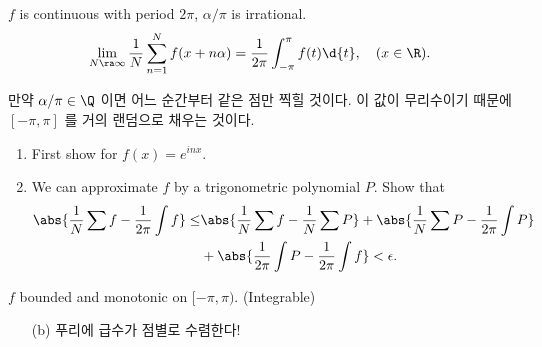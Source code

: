  \(f\) is continuous with period \(2\pi\), \(\alpha/\pi\) is irrational.
\[
    \lim_{N\ra\infty} \frac{1}{N}\sum_{n=1}^N f(x + n\alpha) = \frac{1}{2\pi} \int_{-\pi}^\pi f(t) \d{t}, \quad (x \in \R).
\]

\rmk 만약 \(\alpha / \pi \in \Q\) 이면 어느 순간부터 같은 점만 찍힐 것이다. 이 값이 무리수이기 때문에 \([-\pi, \pi]\) 를 거의 랜덤으로 채우는 것이다.
\begin{enumerate}
    \item First show for \(f(x) = e^{inx}\).
    \item We can approximate \(f\) by a trigonometric polynomial \(P\). Show that
          \[
              \begin{aligned}
                  \abs{\frac{1}{N} \sum f - \frac{1}{2\pi} \int f} \leq & \abs{\frac{1}{N} \sum f - \frac{1}{N} \sum P} + \abs{\frac{1}{N} \sum P - \frac{1}{2\pi} \int P} \\
                                                                        & + \abs{\frac{1}{2\pi} \int P - \frac{1}{2\pi} \int f} < \epsilon.
              \end{aligned}
          \]
\end{enumerate}

 \(f\) bounded and monotonic on \([-\pi, \pi)\). (Integrable)
\begin{enumerate}
    \item[(b)] 푸리에 급수가 점별로 수렴한다!
\end{enumerate}

\pagebreak
